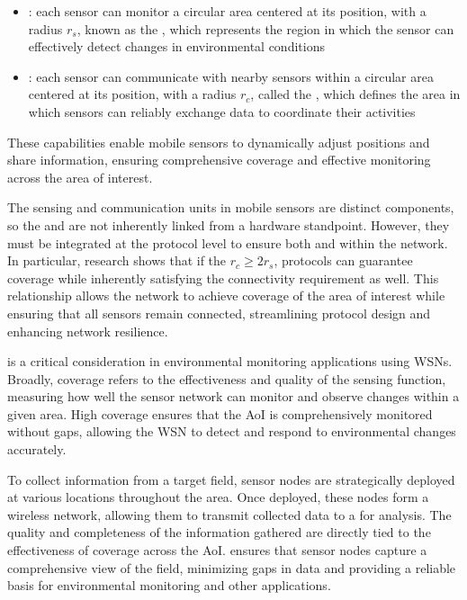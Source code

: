 \documentclass[a4paper, 12pt]{report}
\begin{document}
    \begin{itemize}
        \item {}: each sensor can monitor a circular area centered at its position, with a radius $r_s$, known as the , which represents the region in which the sensor can effectively detect changes in environmental conditions
        \item {}: each sensor can communicate with nearby sensors within a circular area centered at its position, with a radius $r_c$, called the , which defines the area in which sensors can reliably exchange data to coordinate their activities
    \end{itemize}

    These capabilities enable mobile sensors to dynamically adjust positions and share information, ensuring comprehensive coverage and effective monitoring across the area of interest.

    The sensing and communication units in mobile sensors are distinct components, so the  and  are not inherently linked from a hardware standpoint. However, they must be integrated at the protocol level to ensure both  and  within the network. In particular, research shows that if the $r_c \ge 2 r_s$, protocols can guarantee coverage while inherently satisfying the connectivity requirement as well. This relationship allows the network to achieve  coverage of the area of interest while ensuring that all sensors remain connected, streamlining protocol design and enhancing network resilience.

     is a critical consideration in environmental monitoring applications using WSNs. Broadly, coverage refers to the effectiveness and quality of the sensing function, measuring how well the sensor network can monitor and observe changes within a given area. High coverage ensures that the AoI is comprehensively monitored without gaps, allowing the WSN to detect and respond to environmental changes accurately.

    To collect information from a target field, sensor nodes are strategically deployed at various locations throughout the area. Once deployed, these nodes form a wireless network, allowing them to transmit collected data to a  for analysis. The quality and completeness of the information gathered are directly tied to the effectiveness of coverage across the AoI.  ensures that sensor nodes capture a comprehensive view of the field, minimizing gaps in data and providing a reliable basis for environmental monitoring and other applications.
\end{document}
